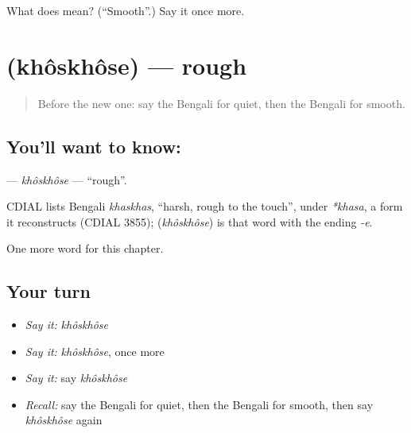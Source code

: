 \begin{tcolorbox}[breakable,colback=teal!4,colframe=teal!35!black,title={Before you move on}]
What does  mean? (\textquotedblleft{}Smooth\textquotedblright{}.) Say it once more.
\end{tcolorbox}
\section[\texorpdfstring{\bn{খসখসে} (khôskhôse)}{খসখসে (khôskhôse)}]{ (khôskhôse) — rough}

\label{lesson:BN-C144-khoskhose}



\begin{quote}
Before the new one: say the Bengali for quiet, then the Bengali for smooth.
\end{quote}

\subsection*{You'll want to know: }
\textbf{} — \emph{khôskhôse} — \textquotedblleft{}rough\textquotedblright{}.

\begin{cousinweb}
CDIAL lists Bengali \emph{khaskhas}, \textquotedblleft{}harsh, rough to the touch\textquotedblright{}, under \emph{*khasa}, a form it reconstructs (CDIAL 3855); \textbf{} (\emph{khôskhôse}) is that word with the ending \emph{-e}.
\end{cousinweb}

\begin{grammarlens}[title={What you've built}]
One more word for this chapter.
\end{grammarlens}

\subsection*{Your turn}
\begin{itemize}
\raggedright
  \item \emph{Say it:} \emph{khôskhôse}
  \item \emph{Say it:} \emph{khôskhôse}, once more
  \item \emph{Say it:} say \emph{khôskhôse}
  \item \emph{Recall:} say the Bengali for quiet, then the Bengali for smooth, then say \emph{khôskhôse} again
\end{itemize}

